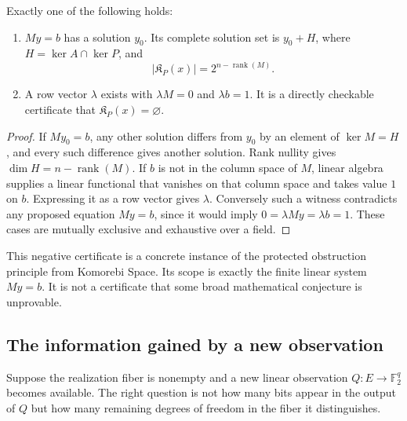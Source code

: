 \begin{PPTtheorem}
\label{PPT:res:23:4}
Exactly one of the following holds:
\begin{enumerate}[label=\textup{(\roman*)}]
\item $My=b$ has a solution $y_0$. Its complete solution set is $y_0+H$, where $H=\ker A\cap\ker P$, and
\[
|\mathfrak K_P(x)|=2^{n-\operatorname{rank}(M)}.
\]
\item A row vector $\lambda$ exists with $\lambda M=0$ and $\lambda b=1$. It is a directly checkable certificate that $\mathfrak K_P(x)=\varnothing$.
\end{enumerate}
\end{PPTtheorem}
\begin{proof}
If $My_0=b$, any other solution differs from $y_0$ by an element of $\ker M=H$, and every such difference gives another solution. Rank nullity gives $\dim H=n-\operatorname{rank}(M)$. If $b$ is not in the column space of $M$, linear algebra supplies a linear functional that vanishes on that column space and takes value $1$ on $b$. Expressing it as a row vector gives $\lambda$. Conversely such a witness contradicts any proposed equation $My=b$, since it would imply $0=\lambda My=\lambda b=1$. These cases are mutually exclusive and exhaustive over a field.
\end{proof}

This negative certificate is a concrete instance of the protected obstruction principle from Komorebi Space. Its scope is exactly the finite linear system $My=b$. It is not a certificate that some broad mathematical conjecture is unprovable.

\subsection{The information gained by a new observation}

Suppose the realization fiber is nonempty and a new linear observation $Q:E\to\mathbb F_2^q$ becomes available. The right question is not how many bits appear in the output of $Q$ but how many remaining degrees of freedom in the fiber it distinguishes.

